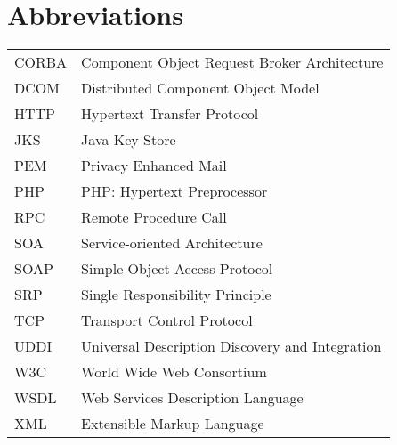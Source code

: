 
\chapter*{Abbreviations}

\begin{tabular}{p{20mm}p{120mm}}

  CORBA & Component Object Request Broker Architecture \\
  DCOM & Distributed Component Object Model \\
  HTTP & Hypertext Transfer Protocol \\
  JKS & Java Key Store \\
  PEM & Privacy Enhanced Mail \\
  PHP & PHP: Hypertext Preprocessor \\
  RPC & Remote Procedure Call \\
  SOA & Service-oriented Architecture \\
  SOAP & Simple Object Access Protocol \\
  SRP & Single Responsibility Principle \\
  TCP & Transport Control Protocol \\
  UDDI & Universal Description Discovery and Integration \\
  W3C & World Wide Web Consortium \\
  WSDL & Web Services Description Language \\
  XML & Extensible Markup Language \\

\end{tabular}
